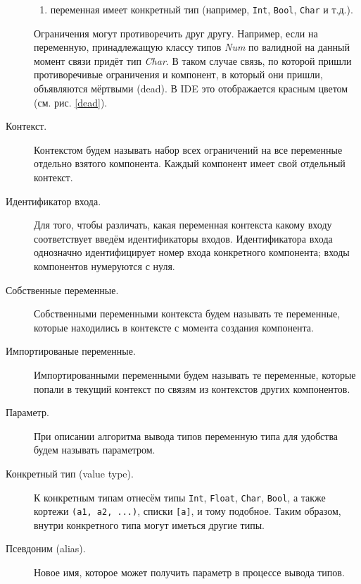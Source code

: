 \begin{description}
\begin{enumerate}[1)]
			\item переменная имеет конкретный тип (например, \lstinline!Int!, \lstinline!Bool!, \lstinline!Char! и т.д.).
		\end{enumerate}  
	Ограничения могут противоречить друг другу. Например, если на переменную, принадлежащую классу типов \textit{Num} по валидной на данный момент связи придёт тип \textit{Char}. В таком случае связь, по которой пришли противоречивые ограничения и компонент, в который они пришли, объявляются мёртвыми (dead). В IDE это отображается красным цветом (см. рис. \ref{dead}).
	\item[Контекст.] Контекстом будем называть набор всех ограничений на все переменные отдельно взятого компонента. Каждый компонент имеет свой отдельный контекст.
	\item[Идентификатор входа.] Для того, чтобы различать, какая переменная контекста какому входу соответствует введём идентификаторы входов. Идентификатора входа однозначно идентифицирует номер входа конкретного компонента; входы компонентов нумеруются с нуля.
	\item[Собственные переменные.] Собственными переменными контекста будем называть те переменные, которые находились в контексте с момента создания компонента.
	\item[Импортированые переменные.] Импортированными переменными будем называть те переменные, которые попали в текущий контекст по связям из контекстов других компонентов.
	\item[Параметр.] При описании алгоритма вывода типов переменную типа для удобства будем называть параметром.
	\item[Конкретный тип (value type).] К конкретным типам отнесём типы \lstinline|Int|, \lstinline|Float|, \lstinline|Char|, \lstinline|Bool|, а также кортежи \lstinline|(a1, a2, ...)|, списки \lstinline|[a]|, и тому подобное. Таким образом, внутри конкретного типа могут иметься другие типы.
	\item[Псевдоним (alias).] Новое имя, которое может получить параметр в процессе вывода типов.
\end{description}

